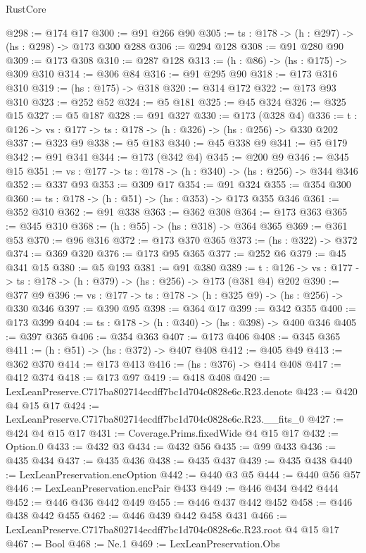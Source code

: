 \begin{lexlean}{RustCore}
\begin{coremodule}
@298 := @174 @17
@300 := @91 @266 @90
@305 := {ts : @178} -> (h : @297) -> (hs : @298) -> @173 @300 @288
@306 := @294 @128
@308 := @91 @280 @90
@309 := @173 @308
@310 := @287 @128
@313 := (h : @86) -> (hs : @175) -> @309 @310
@314 := @306 @84
@316 := @91 @295 @90
@318 := @173 @316 @310
@319 := (hs : @175) -> @318
@320 := @314 @172
@322 := @173 @93 @310
@323 := @252 @52
@324 := @5 @181
@325 := @45 @324
@326 := @325 @15
@327 := @5 @187
@328 := @91 @327
@330 := @173 (@328 @4)
@336 := {t : @126} -> {vs : @177} -> {ts : @178} -> (h : @326) -> (hs : @256) -> @330 @202
@337 := @323 @9
@338 := @5 @183
@340 := @45 @338 @9
@341 := @5 @179
@342 := @91 @341
@344 := @173 (@342 @4)
@345 := @200 @9
@346 := @345 @15
@351 := {vs : @177} -> {ts : @178} -> (h : @340) -> (hs : @256) -> @344 @346
@352 := @337 @93
@353 := @309 @17
@354 := @91 @324
@355 := @354 @300
@360 := {ts : @178} -> (h : @51) -> (hs : @353) -> @173 @355 @346
@361 := @352 @310
@362 := @91 @338
@363 := @362 @308
@364 := @173 @363
@365 := @345 @310
@368 := (h : @55) -> (hs : @318) -> @364 @365
@369 := @361 @53
@370 := @96 @316
@372 := @173 @370 @365
@373 := (hs : @322) -> @372
@374 := @369 @320
@376 := @173 @95 @365
@377 := @252 @6
@379 := @45 @341 @15
@380 := @5 @193
@381 := @91 @380
@389 := {t : @126} -> {vs : @177} -> {ts : @178} -> (h : @379) -> (hs : @256) -> @173 (@381 @4) @202
@390 := @377 @9
@396 := {vs : @177} -> {ts : @178} -> (h : @325 @9) -> (hs : @256) -> @330 @346
@397 := @390 @95
@398 := @364 @17
@399 := @342 @355
@400 := @173 @399
@404 := {ts : @178} -> (h : @340) -> (hs : @398) -> @400 @346
@405 := @397 @365
@406 := @354 @363
@407 := @173 @406
@408 := @345 @365
@411 := (h : @51) -> (hs : @372) -> @407 @408
@412 := @405 @49
@413 := @362 @370
@414 := @173 @413
@416 := (hs : @376) -> @414 @408
@417 := @412 @374
@418 := @173 @97
@419 := @418 @408
@420 := LexLeanPreserve.C717ba802714ecdff7bc1d704c0828e6c.R23.denote
@423 := @420 @4 @15 @17
@424 := LexLeanPreserve.C717ba802714ecdff7bc1d704c0828e6c.R23.__fits_0
@427 := @424 @4 @15 @17
@431 := Coverage.Prims.fixedWide @4 @15 @17
@432 := Option.{0}
@433 := @432 @3
@434 := @432 @56
@435 := @99 @433
@436 := @435 @434
@437 := @435 @436
@438 := @435 @437
@439 := @435 @438
@440 := LexLeanPreservation.encOption
@442 := @440 @3 @5
@444 := @440 @56 @57
@446 := LexLeanPreservation.encPair @433
@449 := @446 @434 @442 @444
@452 := @446 @436 @442 @449
@455 := @446 @437 @442 @452
@458 := @446 @438 @442 @455
@462 := @446 @439 @442 @458 @431
@466 := LexLeanPreserve.C717ba802714ecdff7bc1d704c0828e6c.R23.root @4 @15 @17
@467 := Bool
@468 := Ne.{1}
@469 := LexLeanPreservation.Obs

\end{coremodule}
\end{lexlean}
